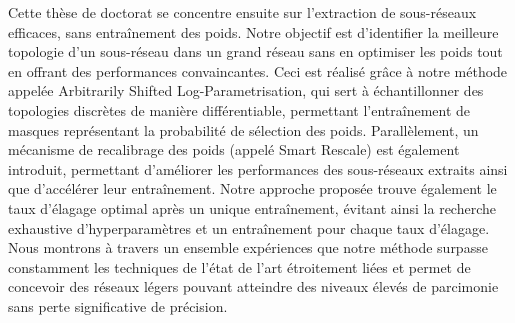 Cette thèse de doctorat se concentre ensuite sur l'extraction de sous-réseaux
efficaces, sans entraînement des poids. Notre objectif est d'identifier la
meilleure topologie d'un sous-réseau dans un grand réseau sans en optimiser les
poids tout en offrant des performances convaincantes. Ceci est réalisé grâce à
notre méthode appelée Arbitrarily Shifted Log-Parametrisation, qui sert à
échantillonner des topologies discrètes de manière différentiable, permettant
l'entraînement de masques représentant la probabilité de sélection des poids.
Parallèlement, un mécanisme de recalibrage des poids (appelé Smart Rescale) est
également introduit, permettant d'améliorer les performances des sous-réseaux
extraits ainsi que d'accélérer leur entraînement. Notre approche proposée trouve
également le taux d'élagage optimal après un unique entraînement, évitant ainsi
la recherche exhaustive d'hyperparamètres et un entraînement pour chaque taux
d'élagage. Nous montrons à travers un ensemble expériences que notre méthode
surpasse constamment les techniques de l'état de l'art étroitement liées et
permet de concevoir des réseaux légers pouvant atteindre des niveaux élevés de
parcimonie sans perte significative de précision.

